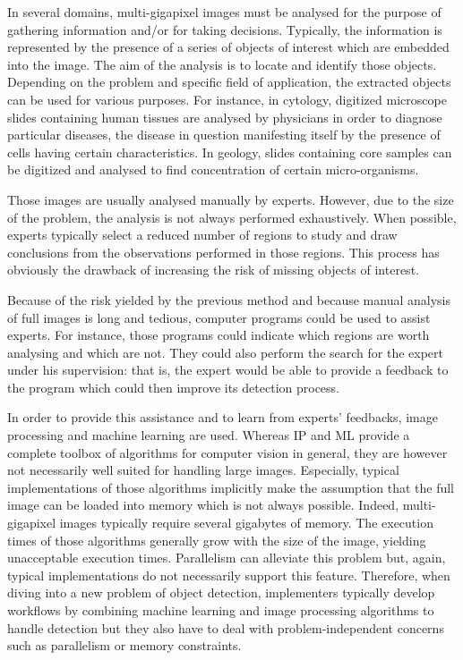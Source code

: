 In several domains, multi-gigapixel images must be analysed for the purpose of gathering information and/or for taking decisions. Typically, the information is represented by the presence of a series of objects of interest which are embedded into the image. The aim of the analysis is to locate and identify those objects. Depending on the problem and  specific field of application, the extracted objects can be used for various purposes. For instance, in cytology, digitized microscope slides containing human tissues are analysed by physicians in order to diagnose particular diseases, the disease in question manifesting itself by the presence of cells having certain characteristics. In geology, slides containing core samples can be digitized and analysed to find concentration of certain micro-organisms.

Those images are usually analysed manually by experts. However, due to the size of the problem, the analysis is not always performed exhaustively. When possible, experts typically select a reduced number of regions to study and draw conclusions from the observations performed in those regions. This process has obviously the drawback of increasing the risk of missing objects of interest.

Because of the risk yielded by the previous method and because manual analysis of full images is long and tedious, computer programs could be used to assist experts. For instance, those programs could indicate which regions are worth analysing and which are not. They could also perform the search for the expert under his supervision: that is, the expert would be able to provide a feedback to the program which could then improve its detection process. 

In order to provide this assistance and to learn from experts' feedbacks, image processing and machine learning are used. Whereas IP and ML provide a complete toolbox of algorithms for computer vision in general, they are however not necessarily well suited for handling large images. Especially, typical implementations of those algorithms implicitly make the assumption that the full image can be loaded into memory which is not always possible. Indeed, multi-gigapixel images typically require several gigabytes of memory. The execution times of those algorithms generally grow with the size of the image, yielding unacceptable execution times. Parallelism can alleviate this problem but, again, typical implementations do not necessarily support this feature. Therefore, when diving into a new problem of object detection, implementers typically develop workflows by combining machine learning and image processing algorithms to handle detection but they also have to deal with problem-independent concerns such as parallelism or memory constraints. 

